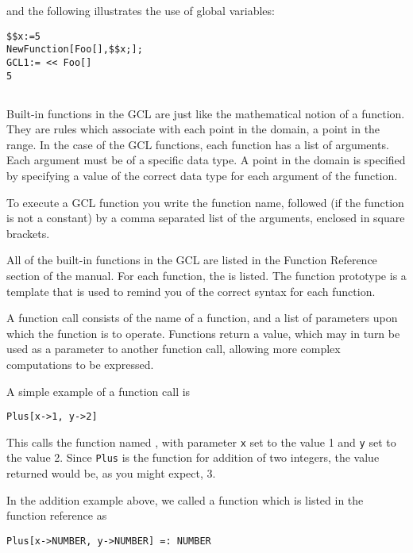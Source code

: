 \noindent
and the following illustrates the use of global variables:

\begin{verbatim}
$$x:=5
NewFunction[Foo[],$$x;];
GCL1:= << Foo[]
5
\end{verbatim}


\subsection{}

Built-in functions in the GCL are just like the mathematical notion of
a function.  They are rules which associate with each point in the  
domain, a point in the range.  In the case of the GCL functions, each
function has a list of arguments.  Each argument must be of a specific
data type.  A point in the domain is specified by specifying a value
of the correct data type for each argument of the function.  

To execute a GCL function you write the function name, followed
(if the function is not a constant) by a comma separated list of the
arguments, enclosed in square brackets.  

All of the built-in functions in the GCL are listed in the Function
Reference section of the manual.  For each function, the  is listed.  The function prototype is a template that is
used to remind you of the correct syntax for each function.  

A function call consists of the name of a function, and a list of
parameters upon which the function is to operate.  Functions return a
value, which may in turn be used as a parameter to another function
call, allowing more complex computations to be expressed.

A simple example of a function call is

\begin{verbatim}
Plus[x->1, y->2]
\end{verbatim}

This calls the function named , with parameter \verb+x+ set
to the value 1 and \verb+y+ set to the value 2.  Since {\tt Plus} is
the function for addition of two integers, the value returned would
be, as you might expect, 3.

In the addition example above, we called a function which is listed in
the function reference as

\begin{verbatim}
Plus[x->NUMBER, y->NUMBER] =: NUMBER
\end{verbatim}

